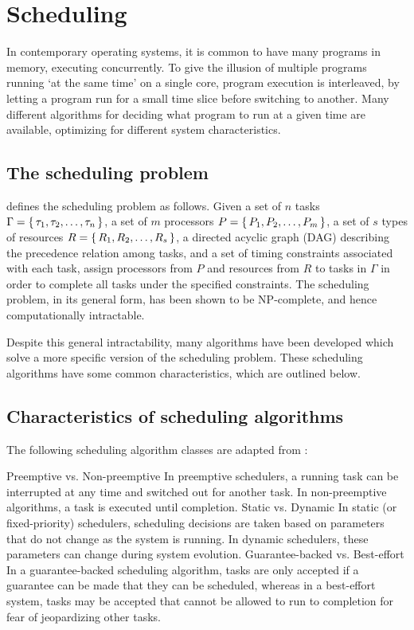 \chapter{Scheduling}
In contemporary operating systems, it is common to have many programs in memory, executing concurrently. To give the illusion of multiple programs running `at the same time' on a single core, program execution is interleaved, by letting a program run for a small time slice before switching to another. Many different algorithms for deciding what program to run at a given time are available, optimizing for different system characteristics.

\section{The scheduling problem}
\textcite{buttazzo2011hard} defines the scheduling problem as follows. Given a set of $n$ tasks $\Gamma = \set{\tau_1, \tau_2, \ldots, \tau_n}$, a set of $m$ processors $P = \set{P_1, P_2, \ldots, P_m}$, a set of $s$ types of resources $R = \set{R_1, R_2, \ldots, R_s}$, a directed acyclic graph (DAG) describing the precedence relation among tasks, and a set of timing constraints associated with each task, assign processors from $P$ and resources from $R$ to tasks in $\Gamma$ in order to complete all tasks under the specified constraints. The scheduling problem, in its general form, has been shown to be NP-complete, and hence computationally intractable.

Despite this general intractability, many algorithms have been developed which solve a more specific version of the scheduling problem. These scheduling algorithms have some common characteristics, which are outlined below.

\section{Characteristics of scheduling algorithms}
The following scheduling algorithm classes are adapted from \textcite{buttazzo2011hard}:
\begin{outline}
    \1 Preemptive vs. Non-preemptive
        \2 In preemptive schedulers, a running task can be interrupted at any time and switched out for another task.
        \2 In non-preemptive algorithms, a task is executed until completion.
    \1 Static vs. Dynamic
        \2 In static (or fixed-priority) schedulers, scheduling decisions are taken based on parameters that do not change as the system is running. In dynamic schedulers, these parameters can change during system evolution.
    \1 Guarantee-backed vs. Best-effort
        \2 In a guarantee-backed scheduling algorithm, tasks are only accepted if a guarantee can be made that they can be scheduled, whereas in a best-effort system, tasks may be accepted that cannot be allowed to run to completion for fear of jeopardizing other tasks.
\end{outline}

